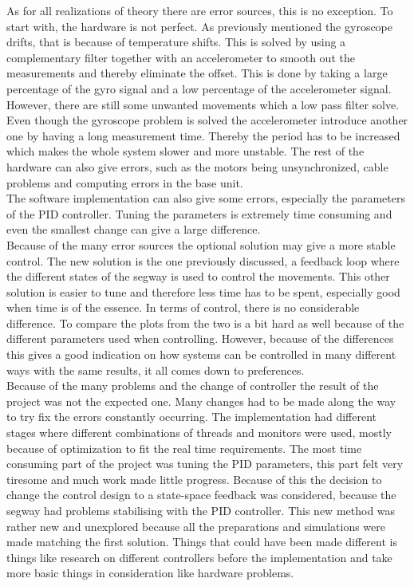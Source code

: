 \documentclass[a4paper]{article}
\begin{document}
As for all realizations of theory there are error sources, this is no exception. To start with, the hardware is not perfect. As previously mentioned the gyroscope drifts, that is because of temperature shifts. This is solved by using a complementary filter together with an accelerometer to smooth out the measurements and thereby eliminate the offset. This is done by taking a large percentage of the gyro signal and a low percentage of the accelerometer signal. However, there are still some unwanted movements which a low pass filter solve. Even though the gyroscope problem is solved the accelerometer introduce another one by having a long measurement time. Thereby the period has to be increased which makes the whole system slower and more unstable. The rest of the hardware can also give errors, such as the motors being unsynchronized, cable problems and computing errors in the base unit.\\

The software implementation can also give some errors, especially the parameters of the PID controller. Tuning the parameters is extremely time consuming and even the smallest change can give a large difference.\\

Because of the many error sources the optional solution may give a more stable control. The new solution is the one previously discussed, a feedback loop where the different states of the segway is used to control the movements. This other solution is easier to tune and therefore less time has to be spent, especially good when time is of the essence. In terms of control, there is no considerable difference. To compare the plots from the two is a bit hard as well because of the different parameters used when controlling. However, because of the differences this gives a good indication on how systems can be controlled in many different ways with the same results, it all comes down to preferences. \\

Because of the many problems and the change of controller the result of the project was not the expected one. Many changes had to be made along the way to try fix the errors constantly occurring. The implementation had different stages where different combinations of threads and monitors were used, mostly because of optimization to fit the real time requirements. The most time consuming part of the project was tuning the PID parameters, this part felt very tiresome and much work made little progress. Because of this the decision to change the control design to a state-space feedback was considered, because the segway had problems stabilising with the PID controller. This new method was rather new and unexplored because all the preparations and simulations were made matching the first solution. Things that could have been made different is things like research on different controllers before the implementation and take more basic things in consideration like hardware problems.
\end{document}
